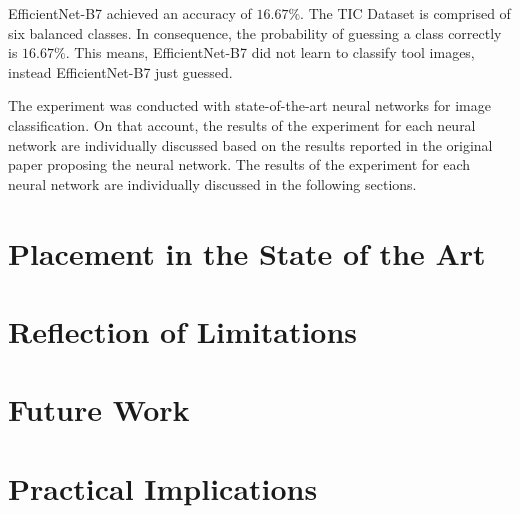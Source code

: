 EfficientNet-B7 achieved an accuracy of $16.67 \%$. The \ac{TIC Dataset} is comprised of six balanced classes. In consequence, the probability of guessing a class correctly is $16.67 \%$. This means, EfficientNet-B7 did not learn to classify tool images, instead EfficientNet-B7 just guessed.
\par
The experiment was conducted with state-of-the-art neural networks for image classification. On that account, the results of the experiment for each neural network are individually discussed based on the results reported in the original paper proposing the neural network. The results of the experiment for each neural network are individually discussed in the following sections.



\section{Placement in the State of the Art}


\section{Reflection of Limitations}
\label{sec:limitations}


\section{Future Work}


\section{Practical Implications}
\label{sec:practical}

